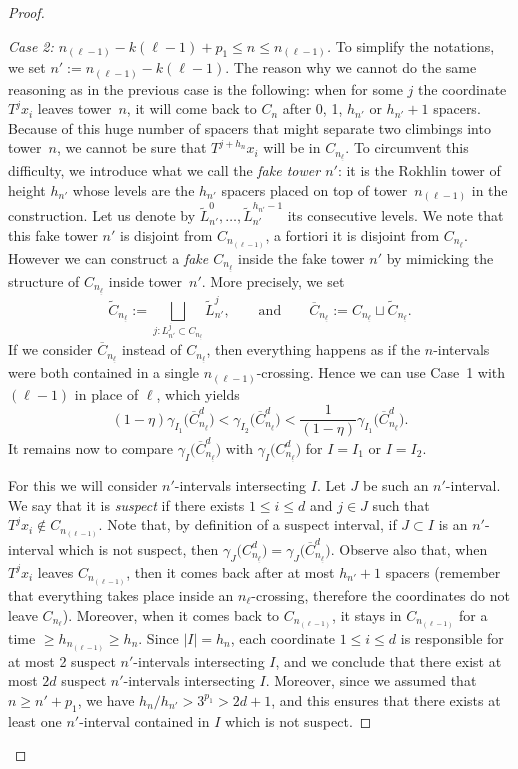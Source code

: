 \documentclass[10pt]{amsart}
\theoremstyle{definition}\newtheorem{defi}[theo]{Definition}\newtheorem{rema}[theo]{Remark}\newtheorem{exam}[theo]{Example}\newtheorem{exem}[theo]{Example}\newtheorem{nota}[theo]{Notation}
\newcommand{\egdef}{:=}
\newcommand{\cd}{C^{d}}
\newcommand{\lb}{\underline{\ell}}
\newcommand{\Gam}[1]{\gamma_{#1}\bigl(\cd_{n_{\lb}}\bigr)}
\newcommand{\Gamb}[1]{\gamma_{#1}\bigl(\overline{C}^d_{n_{\lb}}\bigr)}
\begin{document}
\begin{proof}
\begin{proof}[Case 2: $n_{(\ell-1)}-k(\ell-1)+p_1\le n\le n_{(\ell-1)}$]
To simplify the notations, we set $n'\egdef n_{(\ell-1)}-k(\ell-1)$. The reason why we cannot do the same reasoning as in the previous case is the following: when for some $j$ the coordinate $T^jx_i$ leaves tower~$n$, it will come back to $C_n$ after 0, 1, $h_{n'}$ or $h_{n'}+1$ spacers. Because of this huge number of spacers that might separate two climbings into tower~$n$, we cannot be sure that $T^{j+h_n}x_i$ will be in $C_{n_{\lb}}$. To circumvent this difficulty, we introduce what we call the \emph{fake tower $n'$}: it is the Rokhlin tower of height $h_{n'}$ whose levels are the $h_{n'}$ spacers placed on top of tower~$n_{(\ell-1)}$ in the construction. Let us denote by $\tilde L_{n'}^0,\ldots,\tilde L_{n'}^{h_{n'}-1}$ its consecutive levels. We note that this fake tower $n'$ is disjoint from $C_{n_{(\ell-1)}}$, a fortiori it is disjoint from $C_{n_{\lb}}$. However we can construct a \emph{fake $C_{n_{\lb}}$} inside the fake tower $n'$ by mimicking the structure of $C_{n_{\lb}}$ inside tower~$n'$. More precisely, we set
\[
\tilde C_{n_{\lb}} \egdef \bigsqcup_{j:L_{n'}^j\subset C_{n_{\lb}}} \tilde L_{n'}^j, \qquad\text{and}\qquad
\overline{C}_{n_{\lb}}\egdef C_{n_{\lb}}\sqcup \tilde C_{n_{\lb}}.
\]
If we consider $\overline{C}_{n_{\lb}}$ instead of $C_{n_{\lb}}$, then everything happens as if the $n$-intervals were both contained in a single $n_{(\ell-1)}$-crossing. Hence we can use Case~1 with $(\ell-1)$ in place of $\ell$, which yields
\begin{equation}\label{eq:case1withfake}
(1-\eta) \Gamb{I_1} < \Gamb{I_2} < \frac{1}{(1-\eta)} \Gamb{I_1}.
\end{equation}
It remains now to compare $\Gamb{I}$ with $\Gam{I}$ for $I=I_1$ or $I=I_2$.

For this we will consider $n'$-intervals intersecting $I$. Let $J$ be such an $n'$-interval. We say that it is \emph{suspect} if there exists $1\le i \le d$ and $j\in J$ such that $T^jx_i \notin C_{n_{(\ell-1)}}$. Note that, by definition of a suspect interval, if $J\subset I$ is an $n'$-interval which is not suspect, then $\Gam{J}=\Gamb{J}$. Observe also that, when $T^jx_i$ leaves $C_{n_{(\ell-1)}}$, then it comes back after at most $h_{n'}+1$ spacers (remember that everything takes place inside an $n_{\ell}$-crossing, therefore the coordinates do not leave $C_{n_\ell}$). Moreover, when it comes back to $C_{n_{(\ell-1)}}$, it stays in $C_{n_{(\ell-1)}}$ for a time $\ge h_{n_{(\ell-1)}}\ge h_n$. Since $|I|=h_n$, each coordinate $1\le i\le d$ is responsible for at most 2 suspect $n'$-intervals intersecting $I$, and we conclude that there exist at most $2d$ suspect $n'$-intervals intersecting $I$. Moreover, since we assumed that $n\ge n'+p_1$, we have $h_n/h_{n'}>3^{p_1}>2d+1$, and this ensures that there exists at least one $n'$-interval contained in $I$ which is not suspect.


\end{proof}
\end{proof}
\end{document}
